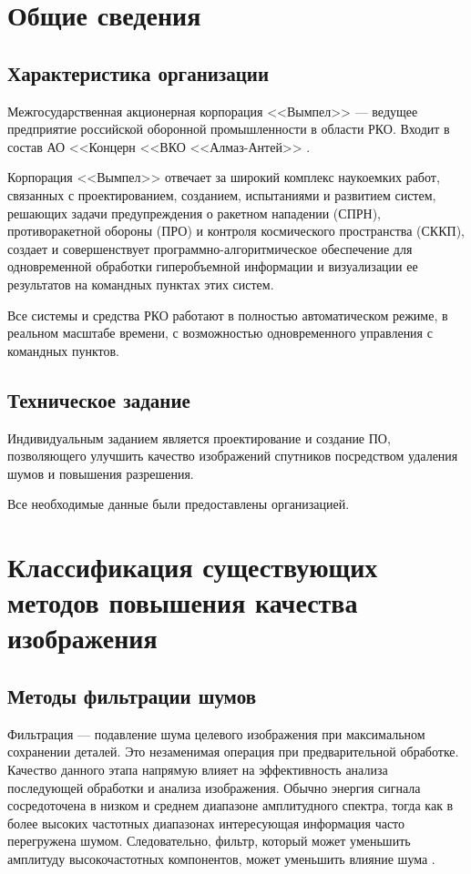 
\chapter{Общие сведения}

\section{Характеристика организации}

Межгосударственная акционерная корпорация <<Вымпел>> --- ведущее предприятие российской оборонной промышленности в области РКО. Входит в состав АО <<Концерн <<ВКО <<Алмаз-Антей>> \cite{macvympel}.

Корпорация <<Вымпел>> отвечает за широкий комплекс наукоемких работ, связанных с проектированием, созданием, испытаниями и развитием систем, решающих задачи предупреждения о ракетном нападении (СПРН), противоракетной обороны (ПРО) и контроля космического пространства (СККП), создает и совершенствует программно-алгоритмическое обеспечение для одновременной обработки гиперобъемной информации и визуализации ее результатов на командных пунктах этих систем. 

Все системы и средства РКО работают в полностью автоматическом режиме, в реальном масштабе времени, с возможностью одновременного управления с командных пунктов.

\section{Техническое задание}

Индивидуальным заданием является проектирование и создание ПО, позволяющего улучшить качество изображений спутников посредством удаления шумов и повышения разрешения. 

Все необходимые данные были предоставлены организацией.


\chapter{Классификация существующих методов повышения качества изображения}

\section{Методы фильтрации шумов}

Фильтрация --- подавление шума целевого изображения при максимальном сохранении деталей. Это незаменимая операция при предварительной обработке. Качество данного этапа напрямую влияет на эффективность анализа последующей обработки и анализа изображения. Обычно энергия сигнала сосредоточена в низком и среднем диапазоне амплитудного спектра, тогда как в более высоких частотных диапазонах интересующая информация часто перегружена шумом. Следовательно, фильтр, который может уменьшить амплитуду высокочастотных компонентов, может уменьшить влияние шума \cite{genfiltering}.

